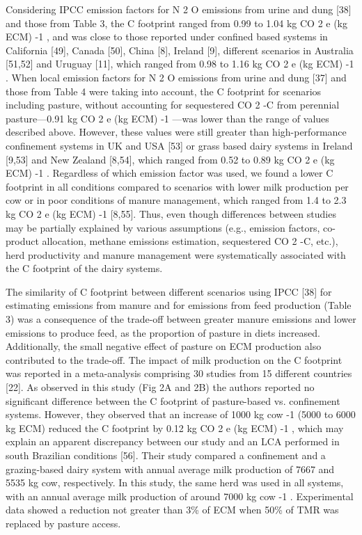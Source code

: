 \documentclass[11pt,a4paper]{article}
\begin{document}
Considering IPCC emission factors for N 2 O emissions from urine and dung [38] and those from Table 3, the C footprint ranged from 0.99 to 1.04 kg CO 2 e (kg ECM) -1 , and was close to those reported under confined based systems in California [49], Canada [50], China [8], Ireland [9], different scenarios in Australia [51,52] and Uruguay [11], which ranged from 0.98 to 1.16 kg CO 2 e (kg ECM) -1 . When local emission factors for N 2 O emissions from urine and dung [37] and those from Table 4 were taking into account, the C footprint for scenarios including pasture, without accounting for sequestered CO 2 -C from perennial pasture—0.91 kg CO 2 e (kg ECM) -1 —was lower than the range of values described above. However, these values were still greater than high-performance confinement systems in UK and USA [53] or grass based dairy systems in Ireland [9,53] and New Zealand [8,54], which ranged from 0.52 to 0.89 kg CO 2 e (kg ECM) -1 . Regardless of which emission factor was used, we found a lower C footprint in all conditions compared to scenarios with lower milk production per cow or in poor conditions of manure management, which ranged from 1.4 to 2.3 kg CO 2 e (kg ECM) -1 [8,55]. Thus, even though differences between studies may be partially explained by various assumptions (e.g., emission factors, co-product allocation, methane emissions estimation, sequestered CO 2 -C, etc.), herd productivity and manure management were systematically associated with the C footprint of the dairy systems.

The similarity of C footprint between different scenarios using IPCC [38] for estimating emissions from manure and for emissions from feed production (Table 3) was a consequence of the trade-off between greater manure emissions and lower emissions to produce feed, as the proportion of pasture in diets increased. Additionally, the small negative effect of pasture on ECM production also contributed to the trade-off. The impact of milk production on the C footprint was reported in a meta-analysis comprising 30 studies from 15 different countries [22]. As observed in this study (Fig 2A and 2B) the authors reported no significant difference between the C footprint of pasture-based vs. confinement systems. However, they observed that an increase of 1000 kg cow -1 (5000 to 6000 kg ECM) reduced the C footprint by 0.12 kg CO 2 e (kg ECM) -1 , which may explain an apparent discrepancy between our study and an LCA performed in south Brazilian conditions [56]. Their study compared a confinement and a grazing-based dairy system with annual average milk production of 7667 and 5535 kg cow, respectively. In this study, the same herd was used in all systems, with an annual average milk production of around 7000 kg cow -1 . Experimental data showed a reduction not greater than 3\% of ECM when 50\% of TMR was replaced by pasture access.
\end{document}
